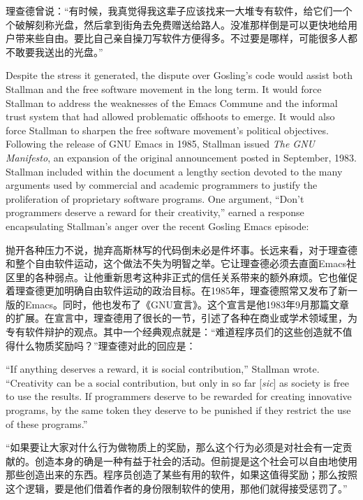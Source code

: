 \ifdefined\chs
理查德曾说：``有时候，我真觉得我这辈子应该找来一大堆专有软件，给它们一个个破解刻称光盘，然后拿到街角去免费赠送给路人。没准那样倒是可以更快地给用户带来些自由。要比自己亲自操刀写软件方便得多。不过要是哪样，可能很多人都不敢要我送出的光盘。''
\fi

\ifdefined\eng
Despite the stress it generated, the dispute over Gosling's code would assist both Stallman and the free software movement in the long term. It would force Stallman to address the weaknesses of the Emacs Commune and the informal trust system that had allowed problematic offshoots to emerge. It would also force Stallman to sharpen the free software movement's political objectives. Following the release of GNU Emacs in 1985, Stallman issued \textit{The GNU Manifesto}, an expansion of the original announcement posted in September, 1983. Stallman included within the document a lengthy section devoted to the many arguments used by commercial and academic programmers to justify the proliferation of proprietary software programs. One argument, ``Don't programmers deserve a reward for their creativity,'' earned a response encapsulating Stallman's anger over the recent Gosling Emacs episode:
\fi

\ifdefined\chs
抛开各种压力不说，抛弃高斯林写的代码倒未必是件坏事。长远来看，对于理查德和整个自由软件运动，这个做法不失为明智之举。它让理查德必须去直面Emacs社区里的各种弱点。让他重新思考这种非正式的信任关系带来的额外麻烦。它也催促着理查德更加明确自由软件运动的政治目标。在1985年，理查德照常又发布了新一版的Emacs。同时，他也发布了《GNU宣言》。这个宣言是他1983年9月那篇文章的扩展。在宣言中，理查德用了很长的一节，引述了各种在商业或学术领域里，为专有软件辩护的观点。其中一个经典观点就是：``难道程序员们的这些创造就不值得什么物质奖励吗？''理查德对此的回应是：
\fi

\ifdefined\eng
``If anything deserves a reward, it is social contribution,'' Stallman wrote. ``Creativity can be a social contribution, but only in so far [\textit{sic}] as society is free to use the results. If programmers deserve to be rewarded for creating innovative programs, by the same token they deserve to be punished if they restrict the use of these programs.''
\fi

\ifdefined\chs
``如果要让大家对什么行为做物质上的奖励，那么这个行为必须是对社会有一定贡献的。创造本身的确是一种有益于社会的活动。但前提是这个社会可以自由地使用那些创造出来的东西。程序员创造了某些有用的软件，如果这值得奖励；那么按照这个逻辑，要是他们借着作者的身份限制软件的使用，那他们就得接受惩罚了。''
\fi

